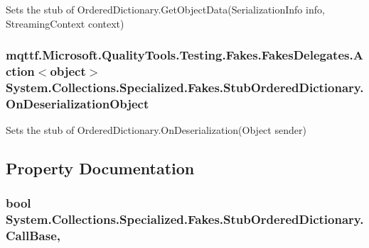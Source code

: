 Sets the stub of Ordered\-Dictionary.\-Get\-Object\-Data(\-Serialization\-Info info, Streaming\-Context context)

\hypertarget{class_system_1_1_collections_1_1_specialized_1_1_fakes_1_1_stub_ordered_dictionary_a188df025d0164bcbb829579b53f3edfa}{
\subsubsection[{On\-Deserialization\-Object}]{\setlength{\rightskip}{0pt plus 5cm}mqttf.\-Microsoft.\-Quality\-Tools.\-Testing.\-Fakes.\-Fakes\-Delegates.\-Action$<$object$>$ System.\-Collections.\-Specialized.\-Fakes.\-Stub\-Ordered\-Dictionary.\-On\-Deserialization\-Object}}\label{class_system_1_1_collections_1_1_specialized_1_1_fakes_1_1_stub_ordered_dictionary_a188df025d0164bcbb829579b53f3edfa}


Sets the stub of Ordered\-Dictionary.\-On\-Deserialization(\-Object sender)



\subsection{Property Documentation}
\hypertarget{class_system_1_1_collections_1_1_specialized_1_1_fakes_1_1_stub_ordered_dictionary_a1e603aa35de4e408005fdf0d408920c9}{
\subsubsection[{Call\-Base}]{\setlength{\rightskip}{0pt plus 5cm}bool System.\-Collections.\-Specialized.\-Fakes.\-Stub\-Ordered\-Dictionary.\-Call\-Base\hspace{0.3cm}{\ttfamily [get]}, {\ttfamily [set]}}}\label{class_system_1_1_collections_1_1_specialized_1_1_fakes_1_1_stub_ordered_dictionary_a1e603aa35de4e408005fdf0d408920c9}


